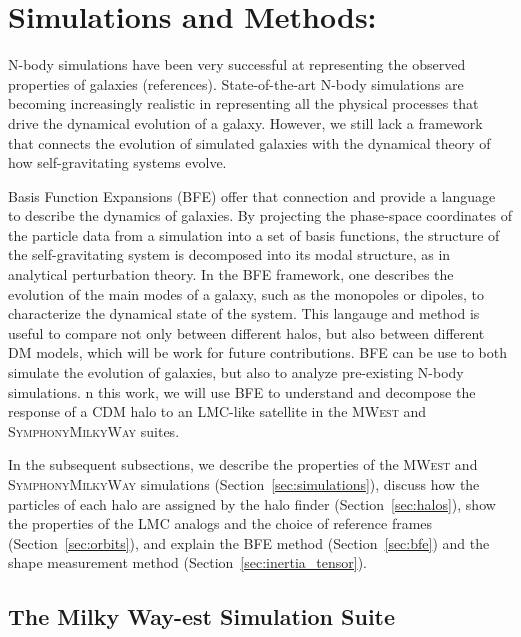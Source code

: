 \documentclass[twocolumn, linenumbers]{openjournal}
\newcommand{\mwest}{\textsc{MWest }}
\newcommand{\symphony}{\textsc{SymphonyMilkyWay }}
\begin{document}


\section{Simulations and Methods:}\label{sec:methods}

N-body simulations have been very successful at representing 
the observed properties of galaxies (references). State-of-the-art N-body simulations are
 becoming increasingly realistic in representing all the physical processes that drive the 
 dynamical evolution of a galaxy. However, we still lack a framework that connects the evolution 
 of simulated galaxies with the dynamical theory of how self-gravitating systems evolve.

 Basis Function Expansions (BFE) offer that connection and provide a language to describe 
 the dynamics of galaxies. By projecting the phase-space coordinates of the particle data 
 from a simulation into a set of basis functions, the structure of the self-gravitating system 
 is decomposed into its modal structure, as in analytical perturbation theory. In the BFE framework, 
 one describes the evolution of the main modes of a galaxy, such as the monopoles or dipoles, 
 to characterize the dynamical state of the system. This langauge and method is useful to compare not only between 
different halos, but also between different DM models, which will be work for future contributions. 
BFE can be use to both simulate the evolution of galaxies, but also 
to analyze pre-existing N-body simulations. n this work, we will use BFE to understand and decompose the 
response of a CDM halo to an LMC-like satellite in the \mwest and \symphony suites. 

In the subsequent subsections, we describe the properties of the \mwest and \symphony simulations 
(Section~\ref{sec:simulations}), discuss how the particles of each halo are assigned by the halo 
finder (Section~\ref{sec:halos}), show the properties of the LMC analogs and the choice of reference 
frames (Section~\ref{sec:orbits}), and explain the BFE method (Section~\ref{sec:bfe}) and the shape 
measurement method (Section~\ref{sec:inertia_tensor}).



\subsection{The Milky Way-est Simulation Suite}\label{sec:sims}
\end{document}

